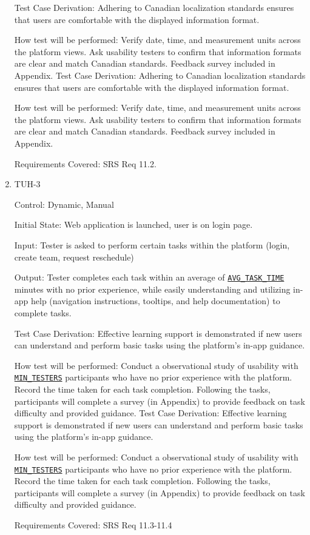 \documentclass[12pt, titlepage]{article}
\begin{document}
\begin{enumerate}
        Test Case Derivation: Adhering to Canadian localization standards ensures that users are comfortable with the displayed information format.

        How test will be performed: Verify date, time, and measurement units across the platform views. Ask usability testers to confirm that information formats are clear and match Canadian standards. Feedback survey included in Appendix.
Test Case Derivation: Adhering to Canadian localization standards ensures that users are comfortable with the displayed information format.
					
How test will be performed: Verify date, time, and measurement units across the platform views. Ask usability testers to confirm that information formats are clear and match Canadian standards. Feedback survey included in Appendix.

Requirements Covered: SRS Req 11.2.

\item{TUH-3\\}

        Control: Dynamic, Manual

        Initial State:  Web application is launched, user is on login page.

        Input: Tester is asked to perform certain tasks within the platform (login, create team, request reschedule)

        Output: Tester completes each task within an average of \hyperref[AVG_TASK_TIME]{\texttt{AVG\_TASK\_TIME}} minutes with no prior experience, while easily understanding and utilizing in-app help (navigation instructions, tooltips, and help documentation) to complete tasks.

        Test Case Derivation: Effective learning support is demonstrated if new users can understand and perform basic tasks using the platform's in-app guidance.

        How test will be performed: Conduct a observational study of usability with \hyperref[MIN_TESTERS]{\texttt{MIN\_TESTERS}} participants who have no prior experience with the platform. Record the time taken for each task completion. Following the tasks, participants will complete a survey (in Appendix) to provide feedback on task difficulty and provided guidance.
Test Case Derivation: Effective learning support is demonstrated if new users can understand and perform basic tasks using the platform's in-app guidance.

How test will be performed: Conduct a observational study of usability with \hyperref[MIN_TESTERS]{\texttt{MIN\_TESTERS}} participants who have no prior experience with the platform. Record the time taken for each task completion. Following the tasks, participants will complete a survey (in Appendix) to provide feedback on task difficulty and provided guidance.

Requirements Covered: SRS Req 11.3-11.4

\end{enumerate}
\end{document}
